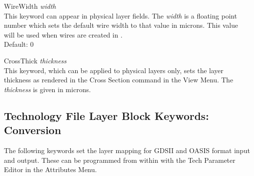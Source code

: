 \begin{description}
\item{\vt WireWidth} {\it width}\\
This keyword can appear in physical layer fields.  The {\it width\/}
is a floating point number which sets the default wire width to that
value in microns.  This value will be used when wires are created in
{\Xic}.\\
Default: 0

\item{\et CrossThick} {\it thickness}\\
This keyword, which can be applied to physical layers only, sets the
layer thickness as rendered in the {\cb Cross Section} command in the
{\cb View Menu}.  The {\it thickness} is given in microns.
\end{description}


\subsection{Technology File Layer Block Keywords:  Conversion}
\label{convlattr}

The following keywords set the layer mapping for GDSII and OASIS
format input and output.  These can be programmed from within {\Xic}
with the {\cb Tech Parameter Editor} in the {\cb Attributes Menu}. 

